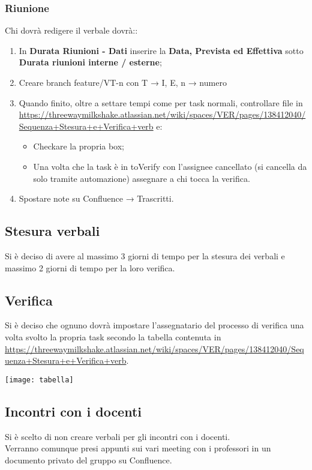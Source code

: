 	\subsubsection{Riunione}
	Chi dovrà redigere il verbale dovrà::
	\begin{enumerate}
		\item In \textbf{Durata Riunioni - Dati} inserire la \textbf{Data, Prevista ed Effettiva}  sotto \textbf{Durata riunioni interne / esterne};
		\item Creare branch feature/VT-n con T → {I, E}, n → numero
		\item Quando finito, oltre a settare tempi come per task normali, controllare file in \url{https://threewaymilkshake.atlassian.net/wiki/spaces/VER/pages/138412040/Sequenza+Stesura+e+Verifica+verb} e:
		\begin{itemize}
			\item Checkare la propria box;
			\item Una volta che la task è in toVerify con l’assignee cancellato (si cancella da solo tramite automazione) assegnare a chi tocca la verifica.
		\end{itemize}
		\item Spostare note su Confluence → Trascritti.
	\end{enumerate}

	\subsection{Stesura verbali}
	Si è deciso di avere al massimo 3 giorni di tempo per la stesura dei verbali e massimo 2 giorni di tempo per la loro verifica.
	
	\subsection{Verifica}
	Si è deciso che ognuno dovrà impostare l'assegnatario del processo di verifica una volta svolto la propria task secondo la tabella contenuta in \url{https://threewaymilkshake.atlassian.net/wiki/spaces/VER/pages/138412040/Sequenza+Stesura+e+Verifica+verb}.
	\begin{center}
		\item \texttt{[image: tabella]}\\
	\end{center}

	\subsection{Incontri con i docenti}
	Si è scelto di non creare verbali per gli incontri con i docenti.\\
	Verranno comunque presi appunti sui vari meeting con i professori in un documento privato del gruppo su Confluence.

	
